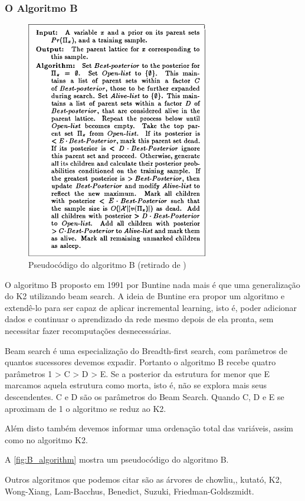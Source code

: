 \subsubsection{O Algoritmo B}
\begin{figure}[htb]
	\centering
	\includegraphics[width = 300px]{figuras/B_Algorithm}
	\caption{Pseudocódigo do algoritmo B (retirado de \cite{buntine91})}
	\label{fig:B_algorithm}
\end{figure}
O algoritmo B proposto em 1991 por Buntine \cite{buntine91} nada mais é que uma generalização do K2 utilizando beam search. A ideia de Buntine era propor um algoritmo e extendê-lo para ser capaz de aplicar incremental learning, isto é, poder adicionar dados e continuar o aprendizado da rede mesmo depois de ela pronta, sem necessitar fazer recomputações desnecessárias.

Beam search é uma especialização do Breadth-first search, com parâmetros de quantos sucessores devemos expadir. Portanto o algoritmo B recebe quatro parâmetros 1 > C > D > E. Se a posterior da estrutura for menor que E marcamos aquela estrutura como morta, isto é, não se explora mais seus descendentes. C e D são os parâmetros do Beam Search. Quando C, D e E se aproximam de 1 o algoritmo se reduz ao K2.

Além disto também devemos informar uma ordenação total das variáveis, assim como no algoritmo K2.

A \autoref{fig:B_algorithm} mostra um pseudocódigo do algoritmo B.

Outros algoritmos que podemos citar são as árvores de chowliu\cite{chow68},, kutató\cite{kutato13}, K2, Wong-Xiang\cite{wong94}, Lam-Bacchus\cite{lam94}, Benedict\cite{benedict96}, Suzuki\cite{suzuki96}, Friedman-Goldszmidt\cite{friedman97}.
